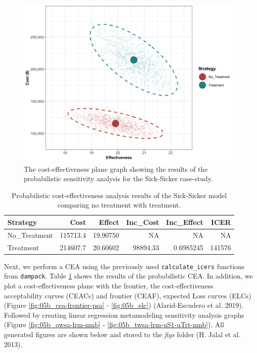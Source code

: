 \documentclass[]{article}
\begin{document}
\begin{figure}
\centering
\includegraphics{../figs/05b_cea-plane-scatter.png}
\caption{The cost-effectiveness plane graph showing the results of the
probabilistic sensitivity analysis for the Sick-Sicker case-study.
\label{fig:05b_CEAplane}}
\end{figure}

\begin{table}[t]

\caption{\label{tab:unnamed-chunk-21}Probabilistic cost-effectiveness analysis results of the Sick-Sicker model comparing no treatment with treatment. \label{tab:df.cea.prob}}
\centering
\begin{tabular}{l|r|r|r|r|r}
\hline
Strategy & Cost & Effect & Inc\_Cost & Inc\_Effect & ICER\\
\hline
No\_Treatment & 115713.4 & 19.90750 & NA & NA & NA\\
\hline
Treatment & 214607.7 & 20.60602 & 98894.33 & 0.6985245 & 141576\\
\hline
\end{tabular}
\end{table}

Next, we perform a CEA using the previously used
\texttt{calculate\_icers} functions from \texttt{dampack}. Table
\ref{tab:df.cea.prob} shows the results of the probabilistic CEA. In
addition, we plot a cost-effectiveness plane with the frontier, the
cost-effectiveness acceptability curves (CEACs) and frontier (CEAF),
expected Loss curves (ELCs) (Figure \ref{fig:05b_cea-frontier-psa} -
\ref{fig:05b_elc}) (Alarid-Escudero et al. 2019). Followed by creating
linear regression metamodeling sensitivity analysis graphs (Figure
\ref{fig:05b_owsa-lrm-nmb} - \ref{fig:05b_twsa-lrm-uS1-uTrt-nmb}). All
generated figures are shown below and stored to the \emph{figs} folder
(H. Jalal et al. 2013).
\end{document}
